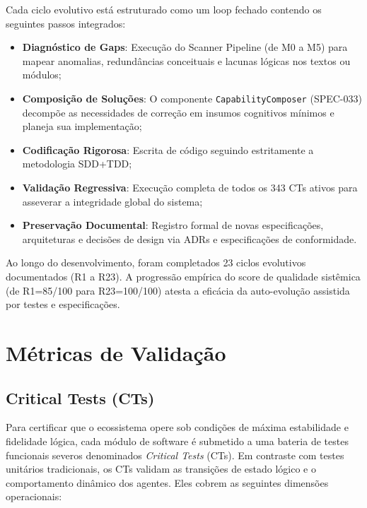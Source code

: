 \documentclass[12pt,a4paper,oneside]{abntex2}
\begin{document}
Cada ciclo evolutivo está estruturado como um loop fechado contendo os seguintes passos integrados:

\begin{itemize}
    \item \textbf{Diagnóstico de Gaps}: Execução do Scanner Pipeline (de M0 a M5) para mapear anomalias, redundâncias conceituais e lacunas lógicas nos textos ou módulos;
    \item \textbf{Composição de Soluções}: O componente \texttt{CapabilityComposer} (SPEC-033) decompõe as necessidades de correção em insumos cognitivos mínimos e planeja sua implementação;
    \item \textbf{Codificação Rigorosa}: Escrita de código seguindo estritamente a metodologia SDD+TDD;
    \item \textbf{Validação Regressiva}: Execução completa de todos os 343 CTs ativos para asseverar a integridade global do sistema;
    \item \textbf{Preservação Documental}: Registro formal de novas especificações, arquiteturas e decisões de design via ADRs e especificações de conformidade.
\end{itemize}

Ao longo do desenvolvimento, foram completados 23 ciclos evolutivos documentados (R1 a R23). A progressão empírica do score de qualidade sistêmica (de R1=85/100 para R23=100/100) atesta a eficácia da auto-evolução assistida por testes e especificações.

\section{Métricas de Validação}

\subsection{Critical Tests (CTs)}

Para certificar que o ecossistema opere sob condições de máxima estabilidade e fidelidade lógica, cada módulo de software é submetido a uma bateria de testes funcionais severos denominados \textit{Critical Tests} (CTs). Em contraste com testes unitários tradicionais, os CTs validam as transições de estado lógico e o comportamento dinâmico dos agentes. Eles cobrem as seguintes dimensões operacionais:
\end{document}
